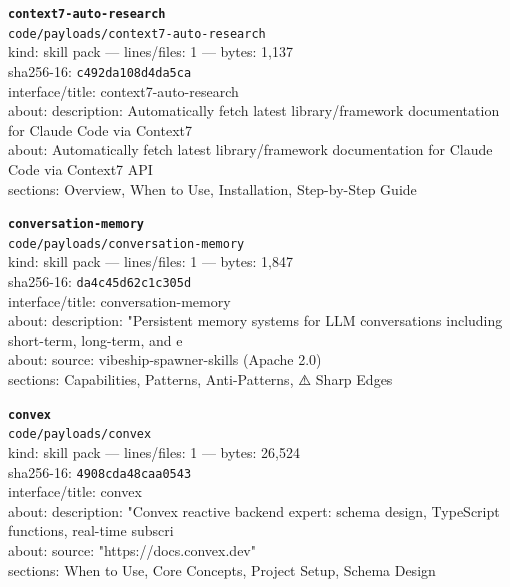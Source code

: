 \noindent\textbf{\texttt{context7-auto-research}}\\
\texttt{code/payloads/context7-auto-research}\\
kind: skill pack --- lines/files: 1 --- bytes: 1,137\\
sha256-16: \texttt{c492da108d4da5ca}\\
interface/title: context7-auto-research\\
about: description: Automatically fetch latest library/framework documentation for Claude Code via Context7\\
about: Automatically fetch latest library/framework documentation for Claude Code via Context7 API\\
sections: Overview, When to Use, Installation, Step-by-Step Guide\\
\vspace*{6.0pt}

\noindent\textbf{\texttt{conversation-memory}}\\
\texttt{code/payloads/conversation-memory}\\
kind: skill pack --- lines/files: 1 --- bytes: 1,847\\
sha256-16: \texttt{da4c45d62c1c305d}\\
interface/title: conversation-memory\\
about: description: "Persistent memory systems for LLM conversations including short-term, long-term, and e\\
about: source: vibeship-spawner-skills (Apache 2.0)\\
sections: Capabilities, Patterns, Anti-Patterns, ⚠️ Sharp Edges\\
\vspace*{6.0pt}

\noindent\textbf{\texttt{convex}}\\
\texttt{code/payloads/convex}\\
kind: skill pack --- lines/files: 1 --- bytes: 26,524\\
sha256-16: \texttt{4908cda48caa0543}\\
interface/title: convex\\
about: description: "Convex reactive backend expert: schema design, TypeScript functions, real-time subscri\\
about: source: "https://docs.convex.dev"\\
sections: When to Use, Core Concepts, Project Setup, Schema Design\\
\vspace*{6.0pt}
\newpage

